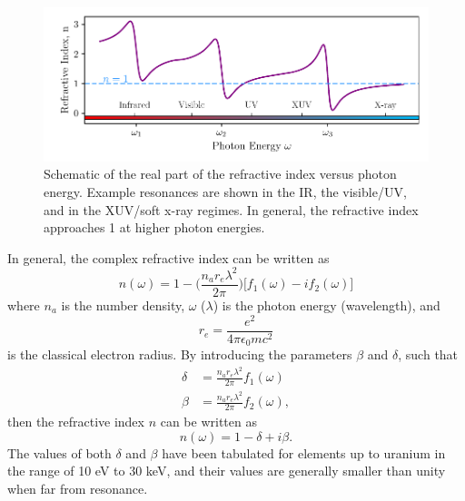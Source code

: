 \begin{figure}
	\centering
	\includegraphics[width=1.0\textwidth]{figures/refractive_index/example_refractive_index.pdf}
	\caption[Schematic of real part of the refractive index from infrared to X-ray wavelengths]{Schematic of the real part of the refractive index versus photon energy. Example resonances are shown in the IR, the visible/UV, and in the XUV/soft x-ray regimes. In general, the refractive index approaches 1 at higher photon energies.}
	\label{fig:refractive_index_schematic}
\end{figure}

In general, the complex refractive index can be written as\cite{attwoodSoftXraysExtreme2000}
\begin{equation}
\label{eqn:refractive_index}
	n(\omega)=1 - \bigg(\frac{n_a r_e \lambda^2}{2\pi}\bigg)\bigg[f_1(\omega) - i f_2(\omega)\bigg]
\end{equation}
where $n_a$ is the number density, $\omega$ ($\lambda$) is the photon energy (wavelength), and
\begin{equation}
\label{eqn:r_e}
	r_e = \frac{e^2}{4\pi\epsilon_0 mc^2}
\end{equation}
is the classical electron radius. By introducing the parameters $\beta$ and $\delta$, such that
\begin{equation}
\label{eqn:delta_beta_def}
	\begin{aligned}
	\delta &= \frac{n_a r_e \lambda^2}{2\pi}f_1(\omega)\\
	\beta & = \frac{n_a r_e \lambda^2}{2\pi}f_2(\omega),
	\end{aligned}
\end{equation}
then the refractive index $n$ can be written as
\begin{equation}
\label{eqn:refractive_index_db}
	n(\omega)=1-\delta+i\beta.
\end{equation}
The values of both $\delta$ and $\beta$ have been tabulated for elements up to uranium in the range of 10 eV to 30 keV\cite{henkeLowenergyXrayInteraction1982}, and their values are generally smaller than unity when far from resonance.

